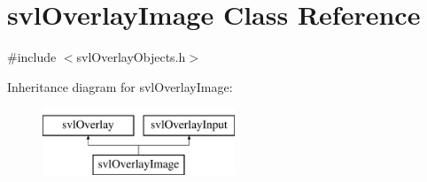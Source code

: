\hypertarget{classsvl_overlay_image}{\section{svl\-Overlay\-Image Class Reference}
\label{classsvl_overlay_image}
}


{\ttfamily \#include $<$svl\-Overlay\-Objects.\-h$>$}

Inheritance diagram for svl\-Overlay\-Image\-:\begin{figure}[H]
\begin{center}
\leavevmode
\includegraphics[height=2.000000cm]{dc/d72/classsvl_overlay_image}
\end{center}
\end{figure}
